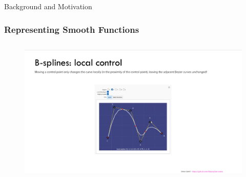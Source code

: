 \documentclass[serif, aspectratio=169]{beamer}
\begin{document}
\begin{frame}{Background and Motivation}
    \frametitle<presentation>{Representing Smooth Functions}
    \begin{figure}
        \centering
        \includegraphics[height=7cm]{image copy 6.png}
    \end{figure}
\end{frame}
\end{document}
